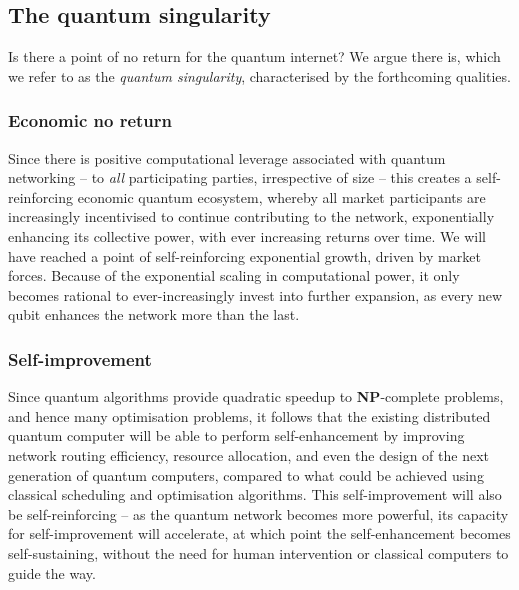 %
%

\subsection{The quantum singularity} \label{sec:singularity} 

Is there a point of no return for the quantum internet? We argue there is, which we refer to as the \textit{quantum singularity}, characterised by the forthcoming qualities.


%
%

\subsubsection{Economic no return}

Since there is positive computational leverage associated with quantum networking -- to \textit{all} participating parties, irrespective of size -- this creates a self-reinforcing economic quantum ecosystem, whereby all market participants are  increasingly incentivised to continue contributing to the network, exponentially enhancing its collective power, with ever increasing returns over time. We will have reached a point of self-reinforcing exponential growth, driven by market forces. Because of the exponential scaling in computational power, it only becomes rational to ever-increasingly invest into further expansion, as every new qubit enhances the network more than the last.

%
%

\subsubsection{Self-improvement}

Since quantum algorithms provide quadratic speedup to \textbf{NP}-complete problems, and hence many optimisation problems, it follows that the existing distributed quantum computer will be able to perform self-enhancement by improving network routing efficiency, resource allocation, and even the design of the next generation of quantum computers, compared to what could be achieved using classical scheduling and optimisation algorithms. This self-improvement will also be self-reinforcing -- as the quantum network becomes more powerful, its capacity for self-improvement will accelerate, at which point the self-enhancement becomes self-sustaining, without the need for human intervention or classical computers to guide the way.

